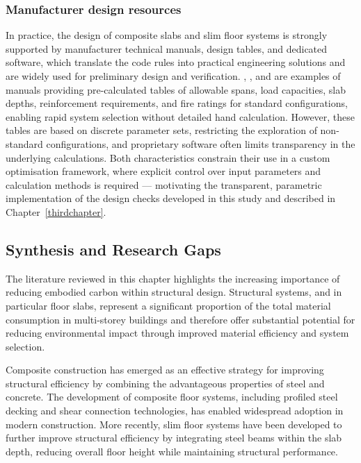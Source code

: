 \subsubsection*{Manufacturer design resources}
In practice, the design of composite slabs and slim floor systems is strongly supported by manufacturer technical manuals, design tables, and dedicated software, which translate the code rules into practical engineering solutions and are widely used for preliminary design and verification. \citet{RefWorks:2017comflor}, \citet{RefWorks:2021floors}, and \citet{RefWorks:kingspan2026multideck} are examples of manuals providing pre-calculated tables of allowable spans, load capacities, slab depths, reinforcement requirements, and fire ratings for standard configurations, enabling rapid system selection without detailed hand calculation. However, these tables are based on discrete parameter sets, restricting the exploration of non-standard configurations, and proprietary software often limits transparency in the underlying calculations. Both characteristics constrain their use in a custom optimisation framework, where explicit control over input parameters and calculation methods is required --- motivating the transparent, parametric implementation of the design checks developed in this study and described in Chapter~\ref{thirdchapter}.

\subsection{Synthesis and Research Gaps}
The literature reviewed in this chapter highlights the increasing importance of reducing embodied carbon within structural design. Structural systems, and in particular floor slabs, represent a significant proportion of the total material consumption in multi-storey buildings and therefore offer substantial potential for reducing environmental impact through improved material efficiency and system selection.

Composite construction has emerged as an effective strategy for improving structural efficiency by combining the advantageous properties of steel and concrete. The development of composite floor systems, including profiled steel decking and shear connection technologies, has enabled widespread adoption in modern construction. More recently, slim floor systems have been developed to further improve structural efficiency by integrating steel beams within the slab depth, reducing overall floor height while maintaining structural performance.


